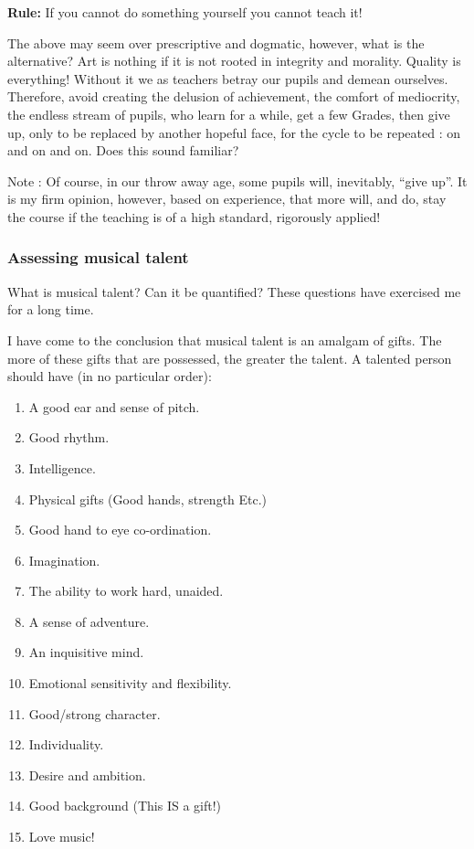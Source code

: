 \documentclass{article}
\begin{document}
\textbf{Rule:} If you cannot do something yourself you cannot teach it!
\newline

The above may seem over prescriptive and dogmatic, however, what is the alternative?
Art is nothing if it is not rooted in integrity and morality.
Quality is everything!
Without it we as teachers betray our pupils and demean ourselves.
Therefore, avoid creating the delusion of achievement, the comfort of mediocrity, the endless stream of pupils, who learn for a while, get a few Grades, then give up, only to be replaced by another hopeful face, for the cycle to be repeated : on and on and on.
Does this sound familiar?

Note : Of course, in our throw away age, some pupils will, inevitably, ``give up''.
It is my firm opinion, however, based on experience, that more will, and do, stay the course if the teaching is of a high standard, rigorously applied!

\subsubsection{Assessing musical talent}

What is musical talent?
Can it be quantified?
These questions have exercised me for a long time.

I have come to the conclusion that musical talent is an amalgam of gifts.
The more of these gifts that are possessed, the greater the talent.
A talented person should have (in no particular order):

\begin{enumerate}
    \item A good ear and sense of pitch.
    \item Good rhythm.
    \item Intelligence.
    \item Physical gifts (Good hands, strength Etc.)
    \item Good hand to eye co-ordination.
    \item Imagination.
    \item The ability to work hard, unaided.
    \item A sense of adventure.
    \item An inquisitive mind.
    \item Emotional sensitivity and flexibility.
    \item Good/strong character.
    \item Individuality.
    \item Desire and ambition.
    \item Good background (This IS a gift!)
    \item Love music!
\end{enumerate}
\end{document}
